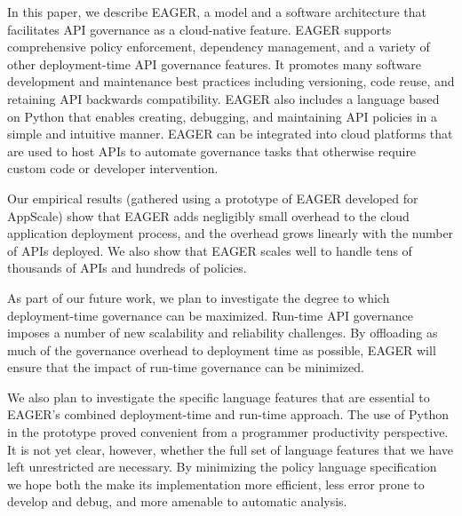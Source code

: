 In this paper, we describe EAGER, a model and a software architecture that 
facilitates API governance as a cloud-native feature. EAGER supports comprehensive policy
enforcement, dependency management, and a variety of other deployment-time API
governance features. It promotes many software development and maintenance
best practices including versioning, code reuse, and retaining API backwards
compatibility. EAGER also includes a language based on Python that enables
creating, debugging, and maintaining API policies in a simple and intuitive
manner. EAGER can be integrated into cloud platforms that are used to host APIs
to automate governance tasks that otherwise require custom code or developer intervention.

Our empirical results (gathered using a prototype of EAGER developed for AppScale)
show that EAGER adds negligibly small overhead to the cloud application 
deployment process, and the overhead grows linearly
with the number of APIs deployed. We also show that EAGER scales well 
to handle tens of thousands of APIs and hundreds of policies. 


As part of our future work, we plan to investigate the degree to which
deployment-time governance can be maximized.
Run-time API governance imposes a number of new scalability and
reliability challenges.  By offloading as much of the governance overhead to
deployment time as possible, EAGER will ensure that the impact of run-time
governance can be minimized.  

We also plan to investigate the specific language features that are essential
to EAGER's combined deployment-time and run-time approach.  The use of Python
in the prototype proved convenient from a programmer productivity perspective.
It is not yet clear, however, whether the full set of language features that
we have left unrestricted are necessary.  By minimizing the policy language
specification we hope both the make its implementation more efficient, less
error prone to develop and debug, and more amenable to automatic analysis.

